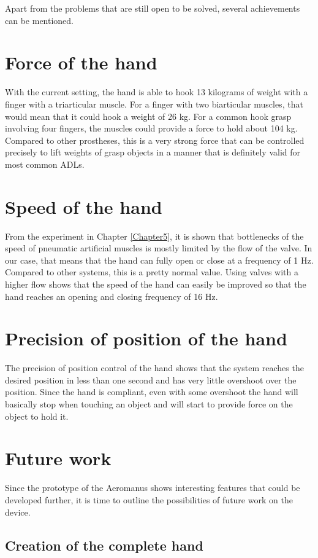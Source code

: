 \documentclass[main]{subfiles}
\begin{document}
Apart from the problems that are still open to be solved, several achievements can be mentioned.

\section{Force of the hand}
With the current setting, the hand is able to hook 13 kilograms of weight with a finger with a triarticular muscle. For a finger with two biarticular muscles, that would mean that it could hook a weight of 26 kg. For a common hook grasp involving four fingers, the muscles could provide a force to hold about 104 kg. Compared to other prostheses, this is a very strong force that can be controlled precisely to lift weights of grasp objects in a manner that is definitely valid for most common ADLs.

\section{Speed of the hand}
From the experiment in Chapter \ref{Chapter5}, it is shown that bottlenecks of the speed of pneumatic artificial muscles is mostly limited by the flow of the valve. In our case, that means that the hand can fully open or close at a frequency of 1 Hz. Compared to other systems, this is a pretty normal value. Using valves with a higher flow shows that the speed of the hand can easily be improved so that the hand reaches an opening and closing frequency of 16 Hz.

\section{Precision of position of the hand}
The precision of position control of the hand shows that the system reaches the desired position in less than one second and has very little overshoot over the position. Since the hand is compliant, even with some overshoot the hand will basically stop when touching an object and will start to provide force on the object to hold it.

\section{Future work}

Since the prototype of the Aeromanus shows interesting features that could be developed further, it is time to outline the possibilities of future work on the device. 

\subsection{Creation of the complete hand}
\end{document}
